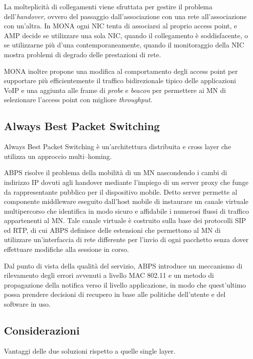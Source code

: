 \documentclass[12pt,a4paper,openright,twoside,draft]{book}
\begin{document}
La molteplicità di collegamenti viene sfruttata per gestire il
problema dell'\emph{handover}, ovvero del passaggio dall'associazione
con una rete all'associazione con un'altra. In MONA ogni NIC tenta di
associarsi al proprio access point, e AMP decide se utilizzare una
sola NIC, quando il collegamento è soddisfacente, o se utilizzarne più
d'una contemporaneamente, quando il monitoraggio della NIC mostra
problemi di degrado delle prestazioni di rete.

MONA inoltre propone una modifica al comportamento degli access point
per supportare più efficientemente il traffico bidirezionale tipico
delle applicazioni VoIP e una aggiunta alle frame di \emph{probe} e
\emph{beacon} per permettere ai MN di selezionare l'access point con
migliore \emph{throughput}.


\subsection{Always Best Packet Switching}

Always Best Packet Switching è un'architettura distribuita e cross
layer che utilizza un approccio multi--homing.

ABPS risolve il problema della mobilità di un MN nascondendo i cambi
di indirizzo IP dovuti agli handover mediante l'impiego di un server
proxy che funge da rappresentante pubblico per il dispositivo
mobile. Detto server permette al componente middleware eseguito
dall'host mobile di instaurare un canale virtuale multipercorso che
identifica in modo sicuro e affidabile i numerosi flussi di traffico
appartenenti al MN. Tale canale virtuale è costruito sulla base dei
protocolli SIP ed RTP, di cui ABPS definisce delle estensioni che
permettono al MN di utilizzare un'interfaccia di rete differente per
l'invio di ogni pacchetto senza dover effettuare modifiche alla
sessione in corso.

Dal punto di vista della qualità del servizio, ABPS introduce un
meccanismo di rilevamento degli errori avvenuti a livello MAC 802.11 e
un metodo di propagazione della notifica verso il livello
applicazione, in modo che quest'ultimo possa prendere decisioni di
recupero in base alle politiche dell'utente e del software in uso.

\subsection{Considerazioni}
Vantaggi delle due soluzioni rispetto a quelle single layer.
\end{document}
